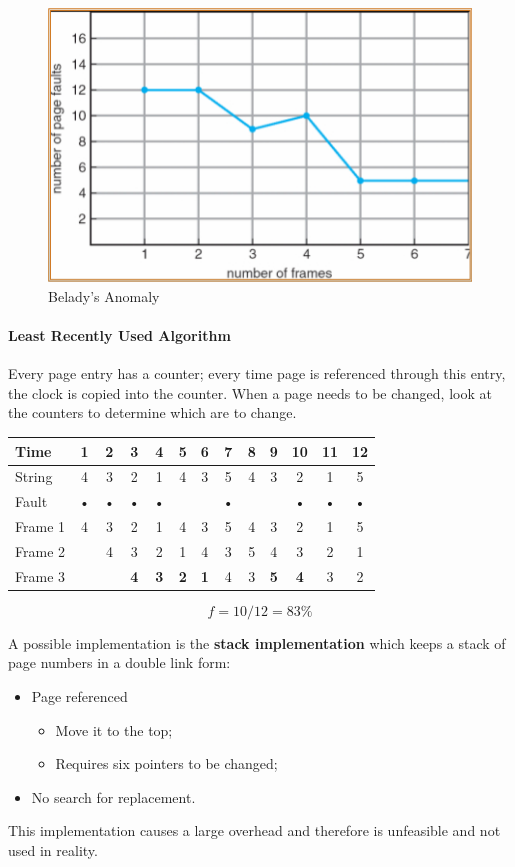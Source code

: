\begin{figure}[hbtp]
\centering
\includegraphics[scale=0.4]{images/virtual_memory/belady_anomaly.jpg}
\caption{Belady's Anomaly}
\end{figure}

\paragraph{Least Recently Used Algorithm}
Every page entry has a counter; every time page is referenced through this entry, the clock is copied into the counter. When a page needs to be changed, look at the counters to determine which are to change.

\begin{center}
\begin{tabular}{l|cccccccccccc}
\hline 
Time & 1 & 2 & 3 & 4 & 5 & 6 & 7 & 8 & 9 & 10 & 11 & 12 \\ 
\hline 
String & 4 & 3 & 2 & 1 & 4 & 3 & 5 & 4 & 3 & 2 & 1 & 5 \\ 
\hline 
Fault & • & • & • & • & & & • & & & • & • & • \\ 
\hline 
Frame 1 & 4 & 3 & 2 & 1 & 4 & 3 & 5 & 4 & 3 & 2 & 1 & 5 \\ 
Frame 2 & & 4 & 3 & 2 & 1 & 4 & 3 & 5 & 4 & 3 & 2 & 1 \\ 
Frame 3 & & & \textbf{4} & \textbf{3} & \textbf{2} & \textbf{1} & 4 & 3 & \textbf{5} & \textbf{4} & 3 & 2 \\ 
\hline 
\end{tabular} 
\[ f = 10/12 = 83 \% \]
\end{center}

A possible implementation is the \textbf{stack implementation} which keeps a stack of page numbers in a double link form:
\begin{itemize}
\item Page referenced
\begin{itemize}
\item Move it to the top;
\item Requires six pointers to be changed;
\end{itemize}
\item No search for replacement.
\end{itemize}
This implementation causes a large overhead and therefore is unfeasible and not used in reality.

